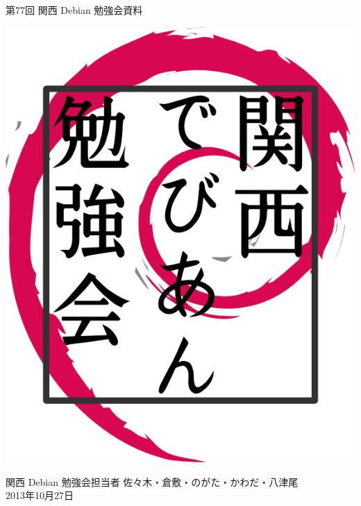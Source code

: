 \documentclass[mingoth,a4paper]{jsarticle}
\newcommand{\debmtgyear}{2013}
\newcommand{\debmtgdate}{27}
\newcommand{\debmtgmonth}{10}
\newcommand{\debmtgnumber}{77}
\begin{document}
\begin{titlepage}


 第\debmtgnumber{}回 関西 Debian 勉強会資料

\vspace{2cm}

\begin{center}
\includegraphics{image200802/kansaidebianlogo.png}
\end{center}

\begin{flushright}
\hfill{}関西 Debian 勉強会担当者 佐々木・倉敷・のがた・かわだ・八津尾 \\
\hfill{}\debmtgyear{}年\debmtgmonth{}月\debmtgdate{}日
\end{flushright}

\thispagestyle{empty}
\end{titlepage}


\vspace{1em}
\end{document}
